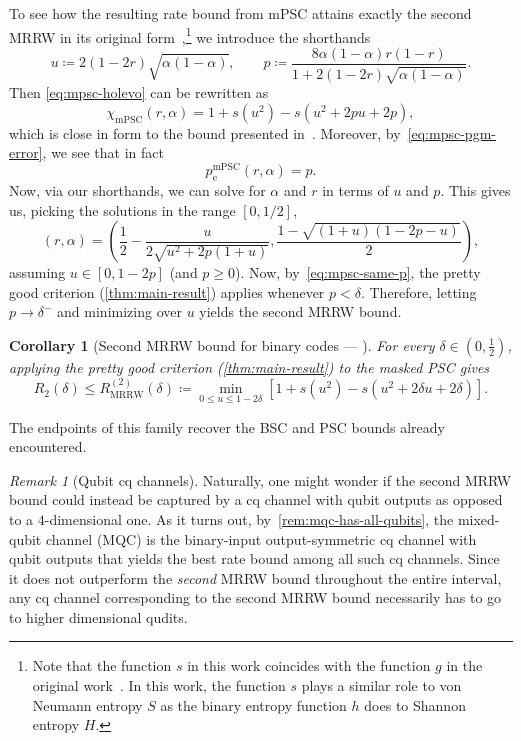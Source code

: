 \documentclass[11pt]{article}
\renewcommand{\leq}{\leqslant}
\renewcommand{\geq}{\geqslant}
\newtheorem{corollary}[corollary]{Corollary}
\theoremstyle{remark}
\newtheorem{remark}{Remark}[section]
\newcommand{\MRRW}{R_{\mathrm{MRRW}}}
\newcommand{\mPSC}{\mathrm{mPSC}}
\begin{document}
To see how the resulting rate bound from mPSC attains exactly the second MRRW in its original form~\cite[Equation~(1.4)]{MRRW77},\footnote{Note that the function $s$ in this work coincides with the function $g$ in the original work~\cite{MRRW77}. In this work, the function $s$ plays a similar role to von Neumann entropy $S$ as the binary entropy function $h$ does to Shannon entropy $H$.} we introduce the shorthands
\begin{equation*}
u \coloneqq 2(1-2r)\sqrt{\alpha(1-\alpha)}, \qquad p \coloneqq \frac{8\alpha(1-\alpha)r(1-r)}{1+2(1-2r)\sqrt{\alpha(1-\alpha)}}.
\end{equation*}
Then \eqref{eq:mpsc-holevo} can be rewritten as 
\begin{equation*}
\chi_{\mPSC}(r,\alpha) = 1+s(u^2)-s\left(u^2+2pu+2p\right),
\end{equation*}
which is close in form to the bound presented in~\cite[Equation~(1.4)]{MRRW77}. Moreover, by~\eqref{eq:mpsc-pgm-error}, we see that in fact
\begin{equation}
\label{eq:mpsc-same-p}
p_{\mathrm{e}}^{\mPSC}(r,\alpha) = p.
\end{equation}
Now, via our shorthands, we can solve for $\alpha$ and $r$ in terms of $u$ and $p$. This gives us, picking the solutions in the range $[0,1/2]$,
\begin{equation*}
(r,\alpha) = \left(\frac{1}{2}-\frac{u}{2\sqrt{u^2+2p(1+u)}}, \frac{1 - \sqrt{(1+u)(1-2p-u)}}{2} \right),
\end{equation*}
assuming $u \in [0,1-2p]$ (and $p \geq 0$). Now, by~\eqref{eq:mpsc-same-p}, the pretty good criterion (\cref{thm:main-result}) applies whenever $p < \delta$. Therefore, letting $p \to \delta^-$ and minimizing over $u$ yields the second MRRW bound.
\begin{corollary}[{Second MRRW bound for binary codes --- \cite[Equation~(1.4)]{MRRW77}}]
\label{cor:mpsc-rate}
For every $\delta \in (0,\frac{1}{2})$, applying the pretty good criterion (\cref{thm:main-result}) to the masked PSC gives
\begin{equation}
\label{eq:second-mrrw}
R_2(\delta) \leq \MRRW^{(2)}(\delta)
\coloneqq
\min_{0 \leq u \leq 1-2\delta}
\left[1+s(u^2)-s\left(u^2+2\delta u+2\delta\right)\right].
\end{equation}
\end{corollary}

The endpoints of this family recover the BSC and PSC bounds already encountered.

\begin{remark}[Qubit cq channels]
\label{rem:second-mrrw-qubit-channels}
Naturally, one might wonder if the second MRRW bound could instead be captured by a cq channel with qubit outputs as opposed to a $4$-dimensional one. As it turns out, by~\cref{rem:mqc-has-all-qubits}, the mixed-qubit channel (MQC) is the binary-input output-symmetric cq channel with qubit outputs that yields the best rate bound among all such cq channels. Since it does not outperform the \emph{second} MRRW bound throughout the entire interval, any cq channel corresponding to the second MRRW bound necessarily has to go to higher dimensional qudits.
\end{remark}
\end{document}

